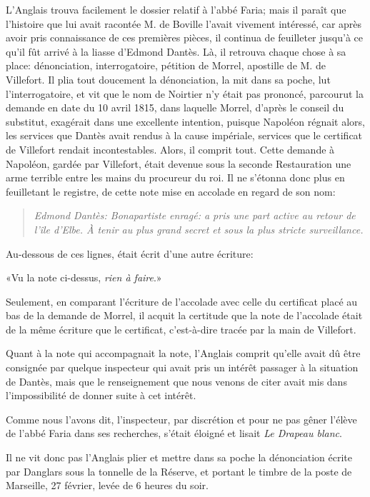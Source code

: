 L'Anglais trouva facilement le dossier relatif à l'abbé Faria; mais il paraît que l'histoire que lui avait racontée M. de Boville l'avait vivement intéressé, car après avoir pris connaissance de ces premières pièces, il continua de feuilleter jusqu'à ce qu'il fût arrivé à la liasse d'Edmond Dantès. Là, il retrouva chaque chose à sa place: dénonciation, interrogatoire, pétition de Morrel, apostille de M. de Villefort. Il plia tout doucement la dénonciation, la mit dans sa poche, lut l'interrogatoire, et vit que le nom de Noirtier n'y était pas prononcé, parcourut la demande en date du 10 avril 1815, dans laquelle Morrel, d'après le conseil du substitut, exagérait dans une excellente intention, puisque Napoléon régnait alors, les services que Dantès avait rendus à la cause impériale, services que le certificat de Villefort rendait incontestables. Alors, il comprit tout. Cette demande à Napoléon, gardée par Villefort, était devenue sous la seconde Restauration une arme terrible entre les mains du procureur du roi. Il ne s'étonna donc plus en feuilletant le registre, de cette note mise en accolade en regard de son nom:

\begin{quote}\itshape
Edmond Dantès: Bonapartiste enragé: a pris une part active au retour de l'île d'Elbe. À tenir au plus grand secret et sous la plus stricte surveillance.
\end{quote}

Au-dessous de ces lignes, était écrit d'une autre écriture:

«Vu la note ci-dessus, \textit{rien à faire}.»

Seulement, en comparant l'écriture de l'accolade avec celle du certificat placé au bas de la demande de Morrel, il acquit la certitude que la note de l'accolade était de la même écriture que le certificat, c'est-à-dire tracée par la main de Villefort.

Quant à la note qui accompagnait la note, l'Anglais comprit qu'elle avait dû être consignée par quelque inspecteur qui avait pris un intérêt passager à la situation de Dantès, mais que le renseignement que nous venons de citer avait mis dans l'impossibilité de donner suite à cet intérêt.

Comme nous l'avons dit, l'inspecteur, par discrétion et pour ne pas gêner l'élève de l'abbé Faria dans ses recherches, s'était éloigné et lisait \textit{Le Drapeau blanc}.

Il ne vit donc pas l'Anglais plier et mettre dans sa poche la dénonciation écrite par Danglars sous la tonnelle de la Réserve, et portant le timbre de la poste de Marseille, 27 février, levée de 6 heures du soir.

